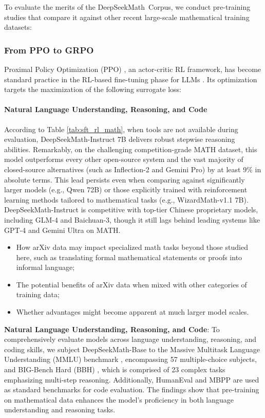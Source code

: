 To evaluate the merits of the DeepSeekMath~Corpus, we conduct pre-training studies that compare it against other recent large-scale mathematical training datasets:

\subsubsection{From PPO to GRPO} Proximal Policy Optimization (PPO) \citep{schulman2017proximal}, an actor-critic RL framework, has become standard practice in the RL-based fine-tuning phase for LLMs \citep{ouyang2022training}. Its optimization targets the maximization of the following surrogate loss:

\paragraph{Natural Language Understanding, Reasoning, and Code}

According to Table \ref{tab:sft_rl_math}, when tools are not available during evaluation, DeepSeekMath-Instruct 7B delivers robust stepwise reasoning abilities. Remarkably, on the challenging competition-grade MATH dataset, this model outperforms every other open-source system and the vast majority of closed-source alternatives (such as Inflection-2 and Gemini Pro) by at least 9\% in absolute terms. This lead persists even when comparing against significantly larger models (e.g., Qwen 72B) or those explicitly trained with reinforcement learning methods tailored to mathematical tasks (e.g., WizardMath-v1.1 7B). DeepSeekMath-Instruct is competitive with top-tier Chinese proprietary models, including GLM-4 and Baichuan-3, though it still lags behind leading systems like GPT-4 and Gemini Ultra on MATH.

\begin{itemize}[topsep=0pt]
    \item How arXiv data may impact specialized math tasks beyond those studied here, such as translating formal mathematical statements or proofs into informal language;
    \item The potential benefits of arXiv data when mixed with other categories of training data;
    \item Whether advantages might become apparent at much larger model scales.
\end{itemize}

\item \textbf{Natural Language Understanding, Reasoning, and Code}: To comprehensively evaluate models across language understanding, reasoning, and coding skills, we subject DeepSeekMath-Base to the Massive Multitask Language Understanding (MMLU) benchmark \citep{mmlu}, encompassing 57 multiple-choice subjects, and BIG-Bench Hard (BBH) \citep{bbh}, which is comprised of 23 complex tasks emphasizing multi-step reasoning. Additionally, HumanEval \citep{codex} and MBPP \citep{mbpp} are used as standard benchmarks for code evaluation. The findings show that pre-training on mathematical data enhances the model's proficiency in both language understanding and reasoning tasks.

